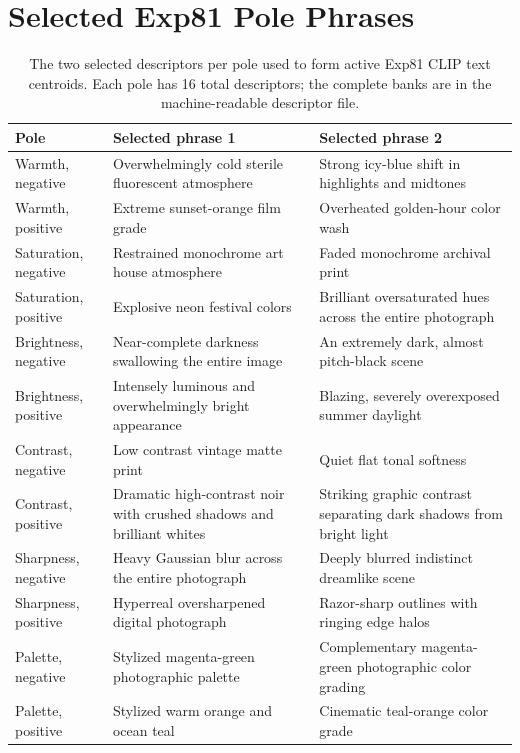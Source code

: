 \documentclass[journal]{IEEEtran}
\begin{document}
\section{Selected Exp81 Pole Phrases}
\begin{table}[t]
\caption{The two selected descriptors per pole used to form active Exp81 CLIP text centroids. Each pole has 16 total descriptors; the complete banks are in the machine-readable descriptor file.}
\label{tab:selected-phrases}
\centering
\footnotesize
\begin{tabularx}{\textwidth}{l X X}
\toprule
Pole & Selected phrase 1 & Selected phrase 2 \\
\midrule
Warmth, negative & Overwhelmingly cold sterile fluorescent atmosphere & Strong icy-blue shift in highlights and midtones \\
Warmth, positive & Extreme sunset-orange film grade & Overheated golden-hour color wash \\
Saturation, negative & Restrained monochrome art house atmosphere & Faded monochrome archival print \\
Saturation, positive & Explosive neon festival colors & Brilliant oversaturated hues across the entire photograph \\
Brightness, negative & Near-complete darkness swallowing the entire image & An extremely dark, almost pitch-black scene \\
Brightness, positive & Intensely luminous and overwhelmingly bright appearance & Blazing, severely overexposed summer daylight \\
Contrast, negative & Low contrast vintage matte print & Quiet flat tonal softness \\
Contrast, positive & Dramatic high-contrast noir with crushed shadows and brilliant whites & Striking graphic contrast separating dark shadows from bright light \\
Sharpness, negative & Heavy Gaussian blur across the entire photograph & Deeply blurred indistinct dreamlike scene \\
Sharpness, positive & Hyperreal oversharpened digital photograph & Razor-sharp outlines with ringing edge halos \\
Palette, negative & Stylized magenta-green photographic palette & Complementary magenta-green photographic color grading \\
Palette, positive & Stylized warm orange and ocean teal & Cinematic teal-orange color grade \\
\bottomrule
\end{tabularx}
\end{table}
\end{document}
